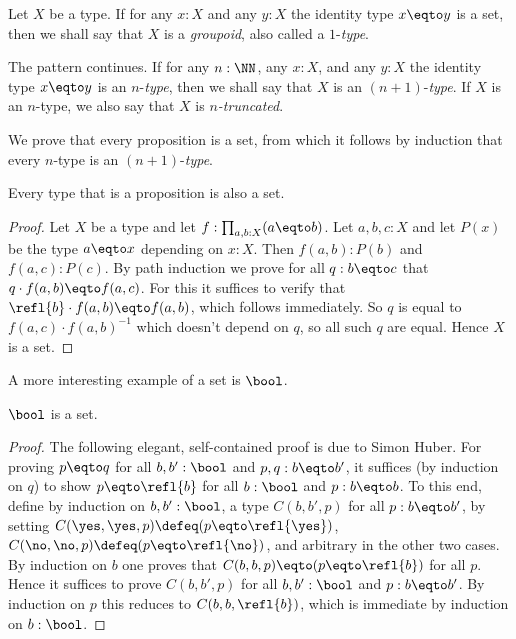 Let $X$ be a type.
If for any $x:X$ and any $y:X$ the identity type $x \eqto y$ is a set,
then we shall say that $X$ is a \emph{groupoid},
also called a $1$-\emph{type}.

The pattern continues.  If for any $n:\NN$, any $x:X$, and any $y:X$
the identity type $x \eqto y$ is an $n$-\emph{type},
then we shall say that $X$ is an $(n+1)$-\emph{type}.
If $X$ is an $n$-type, we also say that $X$ is \emph{$n$-truncated}.

We prove that every proposition is a set, from which it follows
by induction that every $n$-type is an $(n+1)$-\emph{type}.

\begin{lemma}\label{lem:prop-is-set}
Every type that is a proposition is also a set.
\end{lemma}
\begin{proof}
Let $X$ be a type and let $f: \prod_{a,b:X} (a \eqto b)$. Let $a,b,c : X$ and
let $P(x)$ be the type $a \eqto x$ depending on $x:X$. Then
$f(a,b):P(b)$ and $f(a,c):P(c)$. By path induction we prove for
all $q:b \eqto c$ that $q\cdot f(a,b) \eqto f(a,c)$. For this it suffices to
verify that $\refl{b} \cdot f(a,b) \eqto f(a,b)$, which follows immediately.
So $q$ is equal to $f(a,c)\cdot f(a,b)^{-1}$ which doesn't
depend on $q$, so all such $q$ are equal. Hence $X$ is a set.
\end{proof}

A more interesting example of a set is $\bool$.

\begin{lemma}\label{lem:isset-bool}
$\bool$ is a set.
\end{lemma}
\begin{proof}
The following elegant, self-contained proof is due to Simon Huber.
For proving $p \eqto q$ for all $b,b':\bool$ and $p,q: b \eqto b'$,
it suffices (by induction on $q$) to show
$p \eqto \refl{b}$ for all $b:\bool$ and $p: b \eqto b$.
To this end, define by induction on $b,b':\bool$,
a type $C(b,b',p)$ for all $p: b \eqto b'$, by setting
$C(\yes,\yes,p)\defeq (p \eqto \refl{\yes})$,
$C(\no,\no,p)\defeq (p \eqto \refl{\no})$,
and arbitrary in the other two cases.
By induction on $b$ one proves that $C(b,b,p) \eqto (p \eqto \refl{b})$ for all $p$.
Hence it suffices to prove $C(b,b',p)$ for all $b,b':\bool$
and $p: b \eqto b'$. By induction on $p$ this reduces to
$C(b,b,\refl{b})$, which is immediate by induction on $b:\bool$.
\end{proof}

